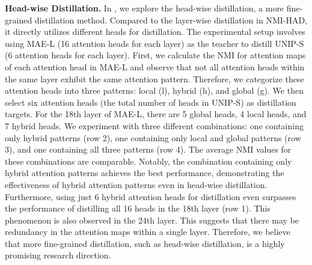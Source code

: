 
\textbf{Head-wise Distillation.} In , we explore the head-wise distillation, a more fine-grained distillation method. Compared to the layer-wise distillation in NMI-HAD, it directly utilizes different heads for distillation. The experimental setup involves using MAE-L (16 attention heads for each layer) as the teacher to distill UNIP-S (6 attention heads for each layer). First, we calculate the NMI for attention maps of each attention head in MAE-L and observe that not all attention heads within the same layer exhibit the same attention pattern. Therefore, we categorize these attention heads into three patterns: local (l), hybrid (h), and global (g). We then select six attention heads (the total number of heads in UNIP-S) as distillation targets. For the 18th layer of MAE-L, there are 5 global heads, 4 local heads, and 7 hybrid heads. We experiment with three different combinations: one containing only hybrid patterns (row 2), one containing only local and global patterns (row 3), and one containing all three patterns (row 4). The average NMI values for these combinations are comparable. Notably, the combination containing only hybrid attention patterns achieves the best performance, demonstrating the effectiveness of hybrid attention patterns even in head-wise distillation. Furthermore, using just 6 hybrid attention heads for distillation even surpasses the performance of distilling all 16 heads in the 18th layer (row 1). This phenomenon is also observed in the 24th layer. This suggests that there may be redundancy in the attention maps within a single layer. Therefore, we believe that more fine-grained distillation, such as head-wise distillation, is a highly promising research direction.